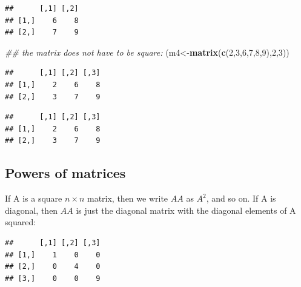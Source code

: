 \documentclass[12pt,]{krantz}
\newenvironment{Shaded}{\begin{snugshade}}{\end{snugshade}}
\newcommand{\CommentTok}[1]{\textcolor[rgb]{0.56,0.35,0.01}{\textit{#1}}}
\newcommand{\DecValTok}[1]{\textcolor[rgb]{0.00,0.00,0.81}{#1}}
\newcommand{\KeywordTok}[1]{\textcolor[rgb]{0.13,0.29,0.53}{\textbf{#1}}}
\newcommand{\NormalTok}[1]{#1}
\newcommand{\OperatorTok}[1]{\textcolor[rgb]{0.81,0.36,0.00}{\textbf{#1}}}
\begin{document}
\begin{verbatim}
##      [,1] [,2]
## [1,]    6    8
## [2,]    7    9
\end{verbatim}

\begin{Shaded}
\begin{Highlighting}[]
\CommentTok{## the matrix does not have to be square:}
\NormalTok{(m4<-}\KeywordTok{matrix}\NormalTok{(}\KeywordTok{c}\NormalTok{(}\DecValTok{2}\NormalTok{,}\DecValTok{3}\NormalTok{,}\DecValTok{6}\NormalTok{,}\DecValTok{7}\NormalTok{,}\DecValTok{8}\NormalTok{,}\DecValTok{9}\NormalTok{),}\DecValTok{2}\NormalTok{,}\DecValTok{3}\NormalTok{))}
\end{Highlighting}
\end{Shaded}

\begin{verbatim}
##      [,1] [,2] [,3]
## [1,]    2    6    8
## [2,]    3    7    9
\end{verbatim}

\begin{Shaded}
\end{Shaded}

\begin{verbatim}
##      [,1] [,2] [,3]
## [1,]    2    6    8
## [2,]    3    7    9
\end{verbatim}

\hypertarget{powers-of-matrices}{%
\subsection{Powers of matrices}\label{powers-of-matrices}}

If A is a square \(n\times n\) matrix, then we write \(AA\) as \(A^2\), and so on. If A is diagonal, then \(AA\) is just the diagonal matrix with the diagonal elements of A squared:

\begin{Shaded}
\end{Shaded}

\begin{verbatim}
##      [,1] [,2] [,3]
## [1,]    1    0    0
## [2,]    0    4    0
## [3,]    0    0    9
\end{verbatim}
\end{document}
